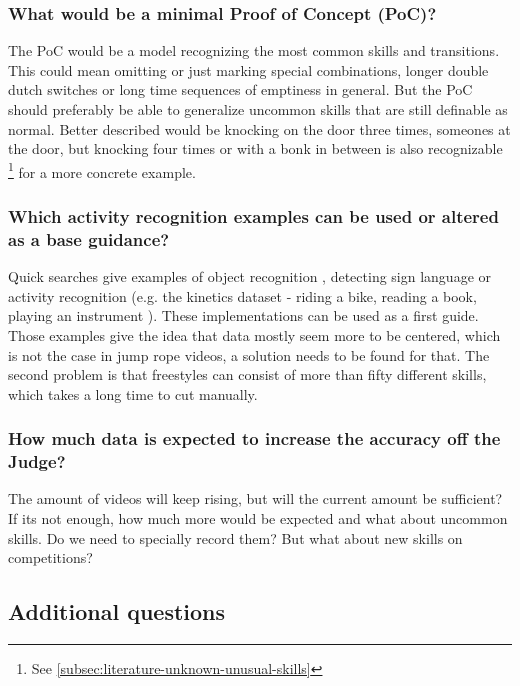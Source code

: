 \subsubsection{What would be a minimal Proof of Concept (PoC)?}
\label{subsubsec:intro-question-poc}

The PoC would be a model recognizing the most common skills and transitions.
This could mean omitting or just marking special combinations, longer double dutch switches or long time sequences of emptiness in general. But the PoC should preferably be able to generalize uncommon skills that are still definable as normal. Better described would be knocking on the door three times, someones at the door, but knocking four times or with a bonk in between is also recognizable \footnote{See \ref{subsec:literature-unknown-unusual-skills}} for a more concrete example.

\subsubsection{Which activity recognition examples can be used or altered as a base guidance?}
\label{subsubsec:intro-question-earlier-research-guidance}

Quick searches give examples of object recognition \autocite{Diwaker_2022}, detecting sign language \autocite{Bora_2023} or activity recognition (e.g. the kinetics dataset - riding a bike, reading a book, playing an instrument \autocite{Kay_2017}).
These implementations can be used as a first guide.
Those examples give the idea that data mostly seem more to be centered, which is not the case in jump rope videos, a solution needs to be found for that. The second problem is that freestyles can consist of more than fifty different skills, which takes a long time to cut manually.

\subsubsection{How much data is expected to increase the accuracy off the Judge?}
\label{subsubsec:intro-question-expected-data-to-increase-accuracy}

The amount of videos will keep rising, but will the current amount be sufficient? If its not enough, how much more would be expected and what about uncommon skills. Do we need to specially record them? But what about new skills on competitions?

\subsection{Additional questions}
\label{subsubsec:intro-question-additional}


